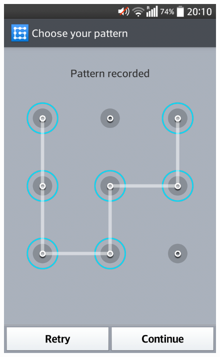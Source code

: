 \begin{figure}[H]
{        \includegraphics[scale=0.09]{pics/experiment/patternprocess4.png}
        \label{fig:patternrecorded}
      }\\
\end{figure}
